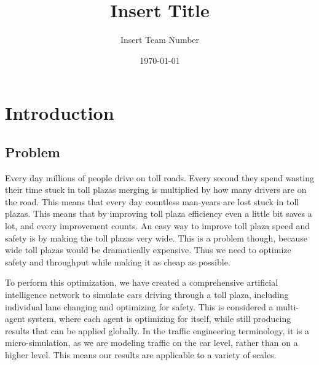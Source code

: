 \documentclass[a4paper, 11pt]{article}
\title{Insert Title}
\author{Insert Team Number}
\date{\today}
\begin{document}
\tableofcontents
\newpage
\thispagestyle{firststyle}





%   
%
%







\section{Introduction}
\subsection{Problem}

Every day millions of people drive on toll roads. Every second they spend wasting their time stuck in toll plazas merging is multiplied by how many drivers are on the road. This means that every day countless man-years are lost stuck in toll plazas. This means that by improving toll plaza efficiency even a little bit saves a lot, and every improvement counts. An easy way to improve toll plaza speed and safety is by making the toll plazas very wide. This is a problem though, because wide toll plazas would be dramatically expensive. Thus we need to optimize safety and throughput while making it as cheap as possible. 

To perform this optimization, we have created a comprehensive artificial intelligence network to simulate cars driving through a toll plaza, including individual lane changing and optimizing for safety. This is considered a multi-agent system, where each agent is optimizing for itself, while still producing results that can be applied globally. In the traffic engineering terminology, it is a micro-simulation, as we are modeling traffic on the car level, rather than on a higher level. This means our results are applicable to a variety of scales. 
\end{document}
